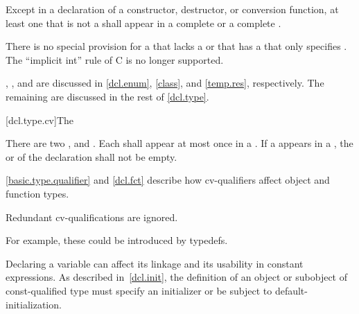\pnum
Except in a declaration of a constructor, destructor, or conversion
function, at least one  that is not a
 shall appear in a complete
 or a complete
.
\begin{footnote}
There is no special
provision for a  that
lacks a  or that has a
 that only specifies .
The ``implicit int'' rule of C is no longer supported.
\end{footnote}

\pnum
\begin{note}
,
,
and
are discussed
in
\ref{dcl.enum},
\ref{class},
and
\ref{temp.res}, respectively. The remaining
 are discussed in the rest of \ref{dcl.type}.
\end{note}

[dcl.type.cv]{The }%
%
%
%

\pnum
There are two ,  and
. Each  shall appear at most once in
a . If a  appears in a
, the 
or  of
the declaration shall not be empty.
\begin{note}
\ref{basic.type.qualifier} and \ref{dcl.fct} describe how cv-qualifiers affect object and
function types.
\end{note}
Redundant cv-qualifications are ignored.
\begin{note}
For example,
these could be introduced by typedefs.
\end{note}

\pnum
\begin{note}
Declaring a variable  can affect its linkage
and its usability in constant expressions. As
described in~\ref{dcl.init}, the definition of an object or subobject
of const-qualified type must specify an initializer or be subject to
default-initialization.
\end{note}


